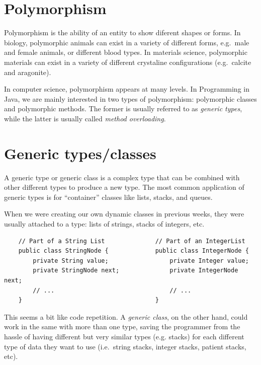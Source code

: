\section{Polymorphism}
\label{sec:polymorphyism}

Polymorphism is the ability of an entity to show diferent shapes or
forms. In biology, polymorphic animals can exist in a variety of
different forms, e.g.~male and female animals, or different blood
types. In materials science, polymorphic materials can exist in a
variety of different crystaline configurations (e.g.~calcite and
aragonite). 

In computer science, polymorphism appears at many levels. In
Programming in Java, we are mainly interested in two types of polymorphism:
polymorphic classes and polymorphic methods. The former is usually
referred to as \emph{generic types}, while the latter is usually
called \emph{method overloading}. 

\section{Generic types/classes}
\label{sec:generic-types}

A generic type or generic class
is a complex type that can be combined with other
different types to produce a new type. 
The most common application of generic types is for
``container'' classes like lists, stacks, and queues. 

When we were creating our own dynamic classes in previous weeks, they
were usually attached to a type: lists of strings, stacks of integers,
etc. 

\begin{verbatim}
    // Part of a String List              // Part of an IntegerList
    public class StringNode {             public class IntegerNode {
        private String value;                 private Integer value;
        private StringNode next;              private IntegerNode next;
        // ...                                // ...
    }                                     }
\end{verbatim}

This seems a bit like code repetition. A \emph{generic class}, on the 
other hand, could work in the same with more than one
type, saving the programmer from the hassle of having different but very
similar types (e.g. stacks) for each different type of data they want
to use (i.e.~string stacks, integer stacks, patient stacks, etc). 

